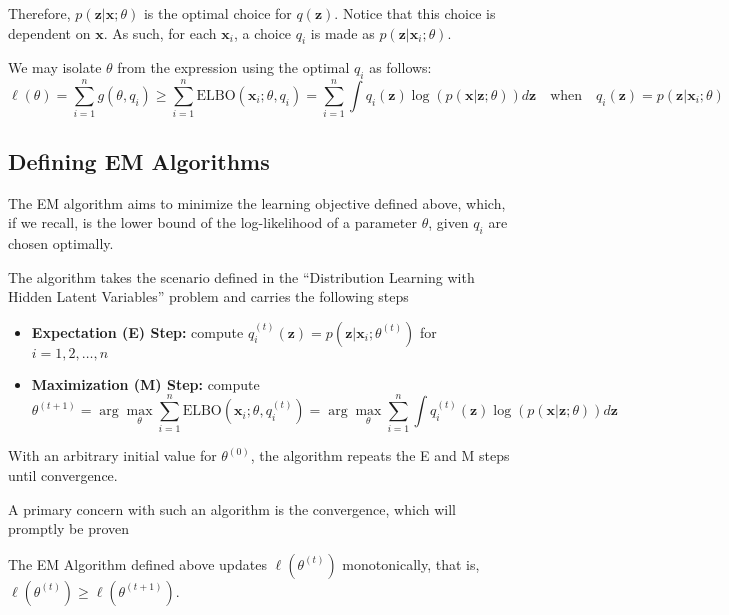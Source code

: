 Therefore, $p(\mathbf{z}|\mathbf{x};\theta)$ is the optimal choice for $q(\mathbf{z})$. Notice that this choice is dependent on $\mathbf{x}$. As such, for each $\mathbf{x}_i$, a choice $q_i$ is made as $p(\mathbf{z}|\mathbf{x}_i;\theta)$.
\begin{definition}
    We may isolate $\theta$ from the expression using the optimal $q_i$ as follows:
    \[
        \ell(\theta) = \sum_{i=1}^n g(\theta,q_i) \ge \sum_{i=1}^n \text{ELBO}(\mathbf{x}_i;\theta,q_i) = \sum_{i=1}^n \int q_i(\mathbf{z}) \log(p(\mathbf{x}|\mathbf{z};\theta)) d\mathbf{z} \quad\text{when}\quad q_i(\mathbf{z})=p(\mathbf{z}|\mathbf{x}_i;\theta)
    \]
\end{definition}
\subsection{Defining EM Algorithms}
The EM algorithm aims to minimize the learning objective defined above, which, if we recall, is the lower bound of the log-likelihood of a parameter $\theta$, given $q_i$ are chosen optimally.
\begin{definition}[EM Algorithm]
    The algorithm takes the scenario defined in the ``Distribution Learning with Hidden Latent Variables'' problem and carries the following steps
    \begin{itemize}
        \item \textbf{Expectation (E) Step:} compute $q_i^{(t)}(\mathbf{z})=p(\mathbf{z}|\mathbf{x}_i;\theta^{(t)})$ for $i=1,2,\dots,n$
        \item \textbf{Maximization (M) Step:} compute
        \[
            \theta^{(t+1)} = \arg\max_{\theta} \sum_{i=1}^n \text{ELBO}(\mathbf{x}_i;\theta,q_i^{(t)}) = \arg\max_{\theta} \sum_{i=1}^n \int q_i^{(t)}(\mathbf{z}) \log(p(\mathbf{x}|\mathbf{z};\theta)) d\mathbf{z}
        \]
    \end{itemize}
    With an arbitrary initial value for $\theta^{(0)}$, the algorithm repeats the E and M steps until convergence.
\end{definition}
A primary concern with such an algorithm is the convergence, which will promptly be proven
\begin{theorem}
    The EM Algorithm defined above updates $\ell(\theta^{(t)})$ monotonically, that is, $\ell(\theta^{(t)})\ge \ell(\theta^{(t+1)})$.
\end{theorem}
